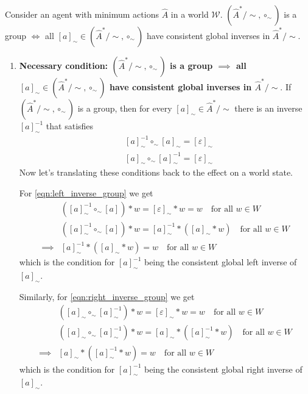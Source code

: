 \begin{propositionE}
    Consider an agent with minimum actions $\hat{A}$ in a world $\mathscr{W}$.
    $(\hat{A}^{*}/\sim, \circ_{\sim})$ is a group $\iff$ all $[a]_{\sim} \in (\hat{A}^{*}/\sim, \circ_{\sim})$ have consistent global inverses in $\hat{A}^{*}/\sim$.
\end{propositionE}
\begin{proofE}
\begin{enumerate}
    \item \textbf{Necessary condition: $(\hat{A}^{*}/\sim, \circ_{\sim})$ is a group $\implies$ all $[a]_{\sim} \in (\hat{A}^{*}/\sim, \circ_{\sim})$ have consistent global inverses in $\hat{A}^{*}/\sim$}.
    If $(\hat{A}^{*}/\sim, \circ_{\sim})$ is a group, then for every $[a]_{\sim} \in \hat{A}^{*}/\sim$ there is an inverse $[a]^{-1}_{\sim}$ that satisfies
    \begin{align}
        & [a]^{-1}_{\sim} \circ_{\sim} [a]_{\sim} = [\varepsilon]_{\sim}
        \label{eqn:left_inverse_group}\\
        & [a]_{\sim} \circ_{\sim} [a]^{-1}_{\sim} = [\varepsilon]_{\sim}
        \label{eqn:right_inverse_group}
    \end{align}
    Now let's translating these conditions back to the effect on a world state.
    
    For \cref{eqn:left_inverse_group} we get
    \begin{align}
        & ([a]^{-1}_{\sim} \circ_{\sim} [a]) \ast w = [\varepsilon]_{\sim} \ast w = w \quad \text{for all $w \in W$} \\
        & ([a]^{-1}_{\sim} \circ_{\sim} [a]) \ast w = [a]^{-1}_{\sim} \ast ([a]_{\sim} \ast w) \quad \text{for all $w \in W$} \\
        \implies & [a]^{-1}_{\sim} \ast ([a]_{\sim} \ast w) = w \quad \text{for all $w \in W$}
    \end{align}
    which is the condition for $[a]^{-1}_{\sim}$ being the consistent global left inverse of $[a]_{\sim}$.
    
    Similarly, for \cref{eqn:right_inverse_group} we get
    \begin{align}
        & ([a]_{\sim} \circ_{\sim} [a]^{-1}_{\sim}) \ast w = [\varepsilon]_{\sim} \ast w = w \quad \text{for all $w \in W$} \\
        & ([a]_{\sim} \circ_{\sim} [a]^{-1}_{\sim}) \ast w = [a]_{\sim} \ast ([a]^{-1}_{\sim} \ast w) \quad \text{for all $w \in W$} \\
        \implies & [a]_{\sim} \ast ([a]^{-1}_{\sim} \ast w) = w \quad \text{for all $w \in W$}
    \end{align}
    which is the condition for $[a]^{-1}_{\sim}$ being the consistent global right inverse of $[a]_{\sim}$.


\end{enumerate}
\end{proofE}
